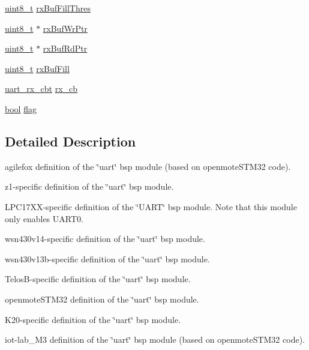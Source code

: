\begin{DoxyCompactItemize}
\hyperlink{_p_e___types_8h_aba7bc1797add20fe3efdf37ced1182c5}{uint8\+\_\+t} \hyperlink{structuart__vars__t_a99c30466e8bcf669e89cc073f5e83705}{rx\+Buf\+Fill\+Thres}
\item 
\hyperlink{_p_e___types_8h_aba7bc1797add20fe3efdf37ced1182c5}{uint8\+\_\+t} $\ast$ \hyperlink{structuart__vars__t_a17b775de21fc076ccef904ee7fda05bf}{rx\+Buf\+Wr\+Ptr}
\item 
\hyperlink{_p_e___types_8h_aba7bc1797add20fe3efdf37ced1182c5}{uint8\+\_\+t} $\ast$ \hyperlink{structuart__vars__t_a9b36fa318315538b7d91c9634f065216}{rx\+Buf\+Rd\+Ptr}
\item 
\hyperlink{_p_e___types_8h_aba7bc1797add20fe3efdf37ced1182c5}{uint8\+\_\+t} \hyperlink{structuart__vars__t_a5d7fc8e5023bfd0001d8049420c4ed3a}{rx\+Buf\+Fill}
\item 
\hyperlink{group__uart_gab8f8d6449d6a994dfb5ede3fca7ac4e2}{uart\+\_\+rx\+\_\+cbt} \hyperlink{structuart__vars__t_a2f1bc9bb67cf1049bb3da08813dce50a}{rx\+\_\+cb}
\item 
\hyperlink{_p_e___types_8h_a97a80ca1602ebf2303258971a2c938e2}{bool} \hyperlink{structuart__vars__t_aee6209e9eed22e14fa14e3a4be9a1009}{flag}
\end{DoxyCompactItemize}


\subsection{Detailed Description}
agilefox definition of the \char`\"{}uart\char`\"{} bsp module (based on openmote\+S\+T\+M32 code). 

z1-\/specific definition of the \char`\"{}uart\char`\"{} bsp module.

L\+P\+C17\+X\+X-\/specific definition of the \char`\"{}\+U\+A\+R\+T\char`\"{} bsp module. Note that this module only enables U\+A\+R\+T0.

wsn430v14-\/specific definition of the \char`\"{}uart\char`\"{} bsp module.

wsn430v13b-\/specific definition of the \char`\"{}uart\char`\"{} bsp module.

Telos\+B-\/specific definition of the \char`\"{}uart\char`\"{} bsp module.

openmote\+S\+T\+M32 definition of the \char`\"{}uart\char`\"{} bsp module.

K20-\/specific definition of the \char`\"{}uart\char`\"{} bsp module.

iot-\/lab\+\_\+\+M3 definition of the \char`\"{}uart\char`\"{} bsp module (based on openmote\+S\+T\+M32 code).

